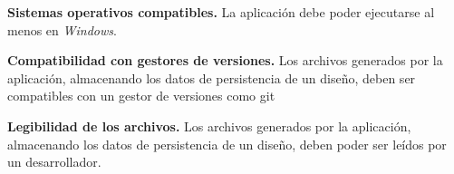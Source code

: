 \item \textbf{Sistemas operativos compatibles.}\newline
	La aplicación debe poder ejecutarse al menos en \textit{Windows}.
\item \textbf{Compatibilidad con gestores de versiones.}\newline
	Los archivos generados por la aplicación, almacenando los datos de persistencia de un diseño, deben ser compatibles con un gestor de versiones como git\cite{git}
\item \textbf{Legibilidad de los archivos.}\newline
	Los archivos generados por la aplicación, almacenando los datos de persistencia de un diseño, deben poder ser leídos por un desarrollador.